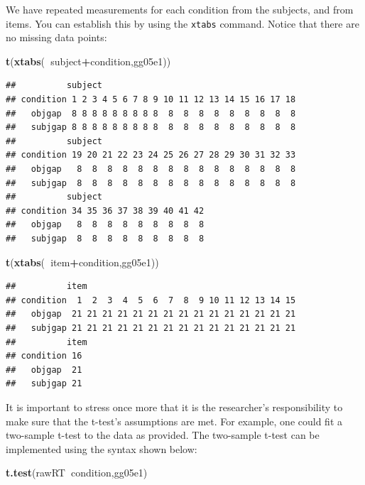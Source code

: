\documentclass[12pt,]{krantz}
\newenvironment{Shaded}{\begin{snugshade}}{\end{snugshade}}
\newcommand{\KeywordTok}[1]{\textcolor[rgb]{0.13,0.29,0.53}{\textbf{#1}}}
\newcommand{\NormalTok}[1]{#1}
\newcommand{\OperatorTok}[1]{\textcolor[rgb]{0.81,0.36,0.00}{\textbf{#1}}}
\begin{document}
We have repeated measurements for each condition from the subjects, and from items. You can establish this by using the \texttt{xtabs} command.
Notice that there are no missing data points:

\begin{Shaded}
\begin{Highlighting}[]
\KeywordTok{t}\NormalTok{(}\KeywordTok{xtabs}\NormalTok{(}\OperatorTok{~}\NormalTok{subject}\OperatorTok{+}\NormalTok{condition,gg05e1))}
\end{Highlighting}
\end{Shaded}

\begin{verbatim}
##          subject
## condition 1 2 3 4 5 6 7 8 9 10 11 12 13 14 15 16 17 18
##   objgap  8 8 8 8 8 8 8 8 8  8  8  8  8  8  8  8  8  8
##   subjgap 8 8 8 8 8 8 8 8 8  8  8  8  8  8  8  8  8  8
##          subject
## condition 19 20 21 22 23 24 25 26 27 28 29 30 31 32 33
##   objgap   8  8  8  8  8  8  8  8  8  8  8  8  8  8  8
##   subjgap  8  8  8  8  8  8  8  8  8  8  8  8  8  8  8
##          subject
## condition 34 35 36 37 38 39 40 41 42
##   objgap   8  8  8  8  8  8  8  8  8
##   subjgap  8  8  8  8  8  8  8  8  8
\end{verbatim}

\begin{Shaded}
\begin{Highlighting}[]
\KeywordTok{t}\NormalTok{(}\KeywordTok{xtabs}\NormalTok{(}\OperatorTok{~}\NormalTok{item}\OperatorTok{+}\NormalTok{condition,gg05e1))}
\end{Highlighting}
\end{Shaded}

\begin{verbatim}
##          item
## condition  1  2  3  4  5  6  7  8  9 10 11 12 13 14 15
##   objgap  21 21 21 21 21 21 21 21 21 21 21 21 21 21 21
##   subjgap 21 21 21 21 21 21 21 21 21 21 21 21 21 21 21
##          item
## condition 16
##   objgap  21
##   subjgap 21
\end{verbatim}

It is important to stress once more that it is the researcher's responsibility to make sure that the t-test's assumptions are met. For example, one could fit a two-sample t-test to the data as provided. The two-sample t-test can be implemented using the syntax shown below:

\begin{Shaded}
\begin{Highlighting}[]
\KeywordTok{t.test}\NormalTok{(rawRT}\OperatorTok{~}\NormalTok{condition,gg05e1)}
\end{Highlighting}
\end{Shaded}
\end{document}
